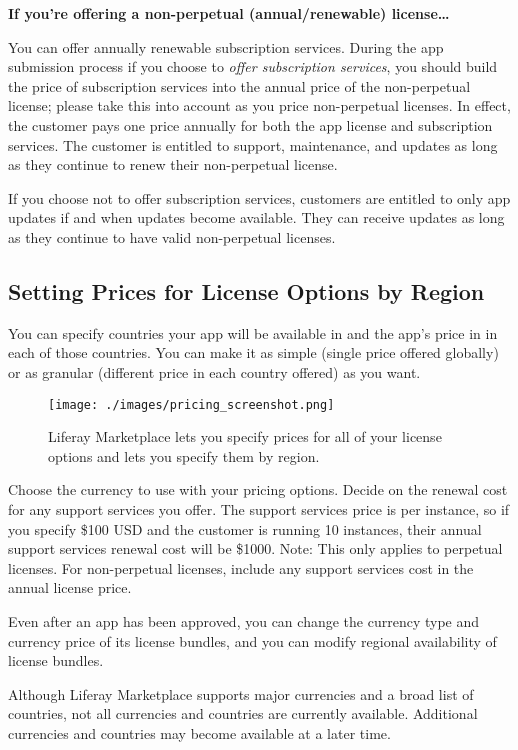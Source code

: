 \textbf{If you're offering a non-perpetual (annual/renewable)
license\ldots{}}

You can offer annually renewable subscription services. During the app
submission process if you choose to \emph{offer subscription services},
you should build the price of subscription services into the annual
price of the non-perpetual license; please take this into account as you
price non-perpetual licenses. In effect, the customer pays one price
annually for both the app license and subscription services. The
customer is entitled to support, maintenance, and updates as long as
they continue to renew their non-perpetual license.

If you choose not to offer subscription services, customers are entitled
to only app updates if and when updates become available. They can
receive updates as long as they continue to have valid non-perpetual
licenses.

\subsection{Setting Prices for License Options by
Region}\label{setting-prices-for-license-options-by-region}

You can specify countries your app will be available in and the app's
price in in each of those countries. You can make it as simple (single
price offered globally) or as granular (different price in each country
offered) as you want.

\begin{figure}
\centering
\texttt{[image: ./images/pricing\_screenshot.png]}
\caption{Liferay Marketplace lets you specify prices for all of your
license options and lets you specify them by region.}
\end{figure}

Choose the currency to use with your pricing options. Decide on the
renewal cost for any support services you offer. The support services
price is per instance, so if you specify \$100 USD and the customer is
running 10 instances, their annual support services renewal cost will be
\$1000. Note: This only applies to perpetual licenses. For non-perpetual
licenses, include any support services cost in the annual license price.

Even after an app has been approved, you can change the currency type
and currency price of its license bundles, and you can modify regional
availability of license bundles.

Although Liferay Marketplace supports major currencies and a broad list
of countries, not all currencies and countries are currently available.
Additional currencies and countries may become available at a later
time.

